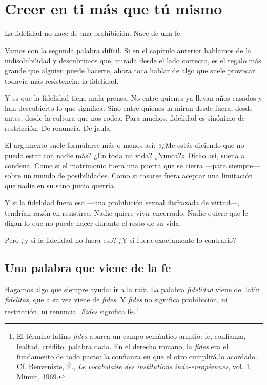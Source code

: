 \chapter{Creer en ti más que tú mismo}

\epigraph{La fidelidad no nace de una prohibición. Nace de una fe.}{}

Vamos con la segunda palabra difícil. Si en el capítulo anterior hablamos de la indisolubilidad y descubrimos que, mirada desde el lado correcto, es el regalo más grande que alguien puede hacerte, ahora toca hablar de algo que suele provocar todavía más resistencia: la fidelidad.

Y es que la fidelidad tiene mala prensa. No entre quienes ya llevan años casados y han descubierto lo que significa. Sino entre quienes la miran desde fuera, desde antes, desde la cultura que nos rodea. Para muchos, fidelidad es sinónimo de restricción. De renuncia. De jaula.

El argumento suele formularse más o menos así: «¿Me estás diciendo que no puedo estar con nadie más? ¿En toda mi vida? ¿Nunca?» Dicho así, suena a condena. Como si el matrimonio fuera una puerta que se cierra ---para siempre--- sobre un mundo de posibilidades. Como si casarse fuera aceptar una limitación que nadie en su sano juicio querría.

Y si la fidelidad fuera eso ---una prohibición sexual disfrazada de virtud---, tendrían razón en resistirse. Nadie quiere vivir encerrado. Nadie quiere que le digan lo que no puede hacer durante el resto de su vida.

Pero ¿y si la fidelidad no fuera eso? ¿Y si fuera exactamente lo contrario?

\section{Una palabra que viene de la fe}

Hagamos algo que siempre ayuda: ir a la raíz. La palabra \textit{fidelidad} viene del latín \textit{fidelitas}, que a su vez viene de \textit{fides}. Y \textit{fides} no significa prohibición, ni restricción, ni renuncia. \textit{Fides} significa \textbf{fe}.\footnote{El término latino \textit{fides} abarca un campo semántico amplio: fe, confianza, lealtad, crédito, palabra dada. En el derecho romano, la \textit{fides} era el fundamento de todo pacto: la confianza en que el otro cumplirá lo acordado. Cf. Benveniste, É., \textit{Le vocabulaire des institutions indo-européennes}, vol. 1, Minuit, 1969.}

